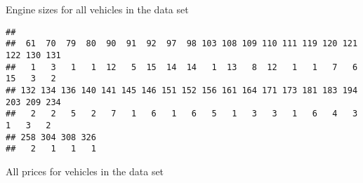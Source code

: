 \documentclass[
]{article}
\newenvironment{Shaded}{\begin{snugshade}}{\end{snugshade}}
\newcommand{\AttributeTok}[1]{\textcolor[rgb]{0.77,0.63,0.00}{#1}}
\newcommand{\FunctionTok}[1]{\textcolor[rgb]{0.00,0.00,0.00}{#1}}
\newcommand{\NormalTok}[1]{#1}
\newcommand{\SpecialCharTok}[1]{\textcolor[rgb]{0.00,0.00,0.00}{#1}}
\newcommand{\StringTok}[1]{\textcolor[rgb]{0.31,0.60,0.02}{#1}}
\begin{document}
Engine sizes for all vehicles in the data set

\begin{Shaded}
\end{Shaded}

\begin{verbatim}
## 
##  61  70  79  80  90  91  92  97  98 103 108 109 110 111 119 120 121 122 130 131 
##   1   3   1   1  12   5  15  14  14   1  13   8  12   1   1   7   6  15   3   2 
## 132 134 136 140 141 145 146 151 152 156 161 164 171 173 181 183 194 203 209 234 
##   2   2   5   2   7   1   6   1   6   5   1   3   3   1   6   4   3   1   3   2 
## 258 304 308 326 
##   2   1   1   1
\end{verbatim}

All prices for vehicles in the data set

\begin{Shaded}
\end{Shaded}
\end{document}
